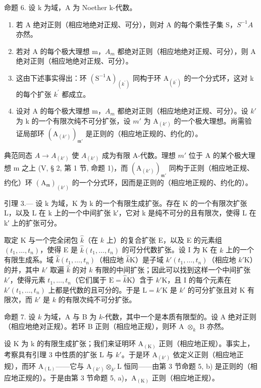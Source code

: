 命题 6. 设 k 为域，A 为 Noether k-代数。

\begin{enumerate}
\def\labelenumi{\alph{enumi})}
\item
  若 A 绝对正则（相应地绝对正规、可分），则对 A 的每个乘性子集 S，\(S^{-1}A\) 亦然。
\item
  若对 A 的每个极大理想 m，\(A_{m}\) 都绝对正则（相应地绝对正规、可分），则 A 绝对正则（相应地绝对正规、可分）。
\item
  这由下述事实得出：环 \((\mathrm{S}^{-1}\mathrm{A})_{(k^{\prime})}\) 同构于环 \(\mathrm{A}_{(k^{\prime})}\) 的一个分式环，这对 k 的每个扩张 \(k^{\prime}\) 都成立。
\item
  设对 A 的每个极大理想 m，\(A_{m}\) 都绝对正则（相应地绝对正规、可分）。设 \(k'\) 为 k 的一个有限次纯不可分扩张，设 \(m'\) 为 \(\mathrm{A}_{(k')}\) 的一个极大理想。尚需验证局部环 \((\mathrm{A}_{(k')})_{\mathfrak{m}'}\) 是正则的（相应地正规的、约化的）。
\end{enumerate}

典范同态 \(A \to A_{(k')}\) 使 \(A_{(k')}\) 成为有限 A-代数。理想 \(m'\) 位于 A 的某个极大理想 m 之上 (V, § 2, 第 1 节, 命题 1)，而 \((\mathrm{A}_{(k')})_{\mathfrak{m}'}\) 同构于正则（相应地正规、约化）环 \((\mathrm{A}_{\mathfrak{m}})_{(k')}\) 的一个分式环，因而是正则的（相应地正规的、约化的）。

引理 3.--- 设 k 为域，K 为 k 的一个有限生成扩张。存在 K 的一个有限次扩张 L，以及 L 在 k 上的一个中间扩张 k′，它对 k 是纯不可分的且有限次，使得 L 在 k′ 上的扩张可分。

取定 K 与一个完全闭包 \(\hat{k}\)（在 \(k\) 上）的复合扩张 E，以及 E 的元素组 \((t_1, \ldots, t_n)\)，使得 E 是 \(\hat{k}(t_1, \ldots, t_n)\) 的可分代数扩张。设 I 为 K 在 \(k\) 上的一个有限生成系。域 \(\hat{k}(t_1, \ldots, t_n)\)（相应地 \(\hat{k}\mathrm{K}\)）是子域 \(k'(t_1, \ldots, t_n)\)（相应地 \(k'\mathrm{K}\)）的并，其中 \(k'\) 取遍 \(\hat{k}\) 的对 \(k\) 有限的中间扩张；因此可以找到这样一个中间扩张 \(k'\)，使得元素 \(t_1, \ldots, t_n\)（它们属于 \(\mathrm{E} = \hat{k}\mathrm{K}\)）含于 \(k'\mathrm{K}\)，且 I 的每个元素在 \(k'(t_1, \ldots, t_n)\) 上都是代数的且可分的。于是 \(\mathrm{L} = k'\mathrm{K}\) 是 \(k'\) 的可分扩张且对 K 有限次，而 \(k'\) 是 \(k\) 的有限次纯不可分扩张。

命题 7. 设 \(k\) 为域，A 与 B 为 \(k\)-代数，其中一个是本质有限型的。设 A 绝对正则（相应地绝对正规）。若环 B 正则（相应地正规），则环 A \(\otimes_{k}\) B 亦然。

设 K 为 k 的有限生成扩张；我们来证明环 \(\mathrm{A}_{(\mathrm{K})}\) 正则（相应地正规）。事实上，考察具有引理 3 中性质的扩张 L 与 \(k'\)。于是环 \(\mathrm{A}_{(k')}\) 依定义正则（相应地正规），而环 \(\mathrm{A}_{(\mathrm{L})}\)——它与 \(\mathrm{A}_{(k')} \otimes_{k'} \mathrm{L}\) 恒同——由第 3 节命题 5, b) 是正则的（相应地正规的）。于是由第 3 节命题 5, a)，\(\mathrm{A}_{(\mathrm{K})}\) 正则（相应地正规）。

